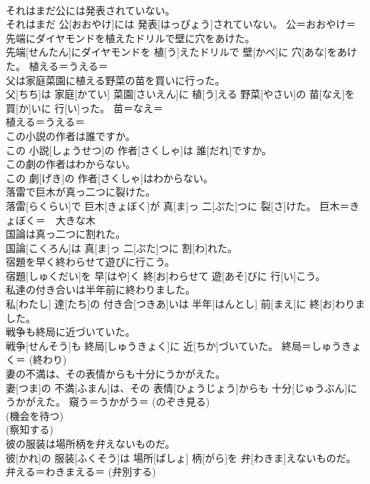 \documentclass[8pt]{extreport}
\begin{document}
\begin{CJK}{UTF8}{min}
{\\	それはまだ公には発表されていない。	
\\	それはまだ 公[おおやけ]には 発表[はっぴょう]されていない。	公＝おおやけ＝ 
\\	先端にダイヤモンドを植えたドリルで壁に穴をあけた。	
\\	先端[せんたん]にダイヤモンドを 植[う]えたドリルで 壁[かべ]に 穴[あな]をあけた。	植える＝うえる＝ 
\\	父は家庭菜園に植える野菜の苗を買いに行った。	
\\	父[ちち]は 家庭[かてい] 菜園[さいえん]に 植[う]える 野菜[やさい]の 苗[なえ]を 買[か]いに 行[い]った。	苗＝なえ＝ 
\\	植える＝うえる＝ 
\\	この小説の作者は誰ですか。	
\\	この 小説[しょうせつ]の 作者[さくしゃ]は 誰[だれ]ですか。	
\\	この劇の作者はわからない。	
\\	この 劇[げき]の 作者[さくしゃ]はわからない。	
\\	落雷で巨木が真っ二つに裂けた。	
\\	落雷[らくらい]で 巨木[きょぼく]が 真[ま]っ 二[ぷた]つに 裂[さ]けた。	巨木＝きょぼく＝　大きな木
\\	国論は真っ二つに割れた。	
\\	国論[こくろん]は 真[ま]っ 二[ぷた]つに 割[わ]れた。	
\\	宿題を早く終わらせて遊びに行こう。	
\\	宿題[しゅくだい]を 早[はや]く 終[お]わらせて 遊[あそ]びに 行[い]こう。	
\\	私達の付き合いは半年前に終わりました。	
\\	私[わたし] 達[たち]の 付き合[つきあ]いは 半年[はんとし] 前[まえ]に 終[お]わりました。	
\\	戦争も終局に近づいていた。	
\\	戦争[せんそう]も 終局[しゅうきょく]に 近[ちか]づいていた。	終局＝しゅうきょく＝ (終わり) 
\\	妻の不満は、その表情からも十分にうかがえた。	
\\	妻[つま]の 不満[ふまん]は、その 表情[ひょうじょう]からも 十分[じゅうぶん]にうかがえた。	窺う＝うかがう＝ (のぞき見る) 
\\	(機会を待つ) 
\\	(察知する) 
\\	彼の服装は場所柄を弁えないものだ。	
\\	彼[かれ]の 服装[ふくそう]は 場所[ばしょ] 柄[がら]を 弁[わきま]えないものだ。	弁える＝わきまえる＝ (弁別する) 
}
\end{CJK}
\end{document}
